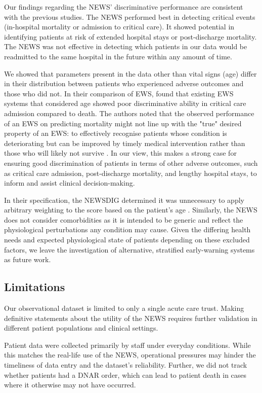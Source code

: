 \documentclass[10pt,journal, compsoc]{IEEEtran}
\begin{document}
Our findings regarding the NEWS' discriminative performance are consistent with the previous studies. The NEWS performed best in detecting critical events (in-hospital mortality or admission to critical care). It showed potential in identifying patients at risk of extended hospital stays or post-discharge mortality. The NEWS was not effective in detecting which patients in our data would be readmitted to the same hospital in the future within any amount of time.

We showed that parameters present in the data other than vital signs (age) differ in their distribution between patients who experienced adverse outcomes and those who did not. In their comparison of EWS, \cite{Smith13} found that existing EWS systems that considered age showed poor discriminative ability in critical care admission compared to death. The authors noted that the observed performance of an EWS on predicting mortality might not line up with the "true" desired property of an EWS: to effectively recognise patients whose condition is deteriorating but can be improved by timely medical intervention rather than those who will likely not survive \cite[pp.~4]{Smith13}. In our view, this makes a strong case for ensuring good discrimination of patients in terms of other adverse outcomes, such as critical care admission, post-discharge mortality, and lengthy hospital stays, to inform and assist clinical decision-making.

In their specification, the NEWSDIG determined it was unnecessary to apply arbitrary weighting to the score based on the patient's age \cite[pp.~19]{RCP17}. Similarly, the NEWS does not consider comorbidities as it is intended to be generic and reflect the physiological perturbations any condition may cause. Given the differing health needs and expected physiological state of patients depending on these excluded factors, we leave the investigation of alternative, stratified early-warning systems as future work.

\subsection{Limitations}
Our observational dataset is limited to only a single acute care trust. Making definitive statements about the utility of the NEWS requires further validation in different patient populations and clinical settings.

Patient data were collected primarily by staff under everyday conditions. While this matches the real-life use of the NEWS, operational pressures may hinder the timeliness of data entry and the dataset's reliability. Further, we did not track whether patients had a DNAR order, which can lead to patient death in cases where it otherwise may not have occurred.
\end{document}

